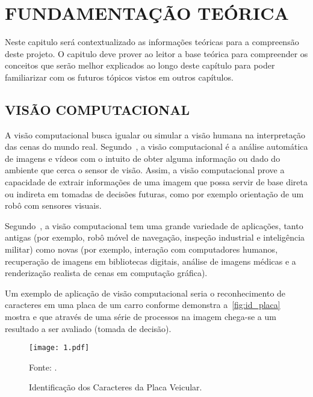 \chapter{\textbf{\uppercase{Fundamentação Teórica}}}\label{cap_2}

Neste capitulo será contextualizado as informações teóricas para a compreensão deste projeto. O capitulo deve prover ao leitor a base teórica para compreender os conceitos que serão melhor explicados ao longo deste capítulo para poder familiarizar com os futuros tópicos vistos em outros capítulos.

\section{\uppercase{Visão Computacional}}

A visão computacional busca igualar ou simular a visão humana na interpretação das cenas do mundo real. Segundo~, a visão computacional é a análise automática de imagens e vídeos com o intuito de obter alguma informação ou dado do ambiente que cerca o sensor de visão. Assim, a visão computacional prove a capacidade de extrair informações de uma imagem que possa servir de base direta ou indireta em tomadas de decisões futuras, como por exemplo orientação de um robô com sensores visuais.

Segundo~, a visão computacional tem uma grande variedade de aplicações, tanto antigas (por exemplo, robô móvel de navegação, inspeção industrial e inteligência militar) como novas (por exemplo, interação com computadores humanos, recuperação de imagens em bibliotecas digitais, análise de imagens médicas e a renderização realista de cenas em computação gráfica).

Um exemplo de aplicação de visão computacional seria o reconhecimento de caracteres em uma placa de um carro conforme demonstra a~\autoref{fig:id_placa} mostra e que através de uma série de processos na imagem chega-se a um resultado a ser avaliado (tomada de decisão). 

\begin{figure}[htb]
	\centering
	\caption{{\footnotesize Identificação dos Caracteres da Placa Veicular.}}   %
	\label{fig:id_placa}
	\texttt{[image: 1.pdf]}
	
	{\footnotesize Fonte: .}
\end{figure}

